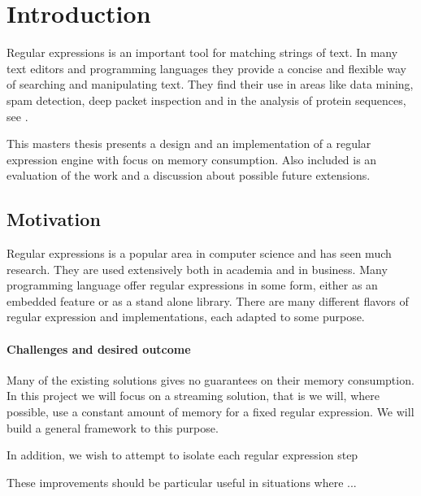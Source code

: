 \section{Introduction}
Regular expressions is an important tool for matching strings of
text. In many text editors and programming languages they provide a
concise and flexible way of searching and manipulating text. They find
their use in areas like data mining, spam detection, deep packet
inspection and in the analysis of protein sequences, see
\cite{pedersen2010}.

This masters thesis presents a design and an implementation of a
regular expression engine with focus on memory consumption. Also 
included is an evaluation of the work and a discussion about possible
future extensions.



\subsection{Motivation}

Regular expressions is a popular area in computer science and has seen
much research. They are used extensively both in academia and in
business. Many programming language offer regular expressions in some
form, either as an embedded feature or as a stand alone
library. There are many different flavors of regular expression and
implementations, each adapted to some purpose. 


\paragraph{Challenges and desired outcome}
Many of the existing solutions gives no guarantees on their memory
consumption. In this project we will focus on a streaming solution,
that is we will, where possible, use a constant amount of memory for a
fixed regular expression. We will build a general framework to this
purpose.

In addition, we wish to attempt to isolate each regular expression step 


These improvements should be particular useful in situations where ...


